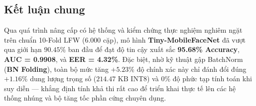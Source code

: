 \documentclass[11pt,a4paper]{article}
\begin{document}
\subsection{Kết luận chung}
Qua quá trình nâng cấp có hệ thống và kiểm chứng thực nghiệm nghiêm ngặt trên chuẩn 10-Fold LFW (6.000 cặp), mô hình \textbf{Tiny-MobileFaceNet} đã vượt qua giới hạn $90.45\%$ ban đầu để đạt độ tin cậy xuất sắc \textbf{95.68\% Accuracy}, \textbf{AUC = 0.9908}, và \textbf{EER = 4.32\%}. Đặc biệt, nhờ kỹ thuật gập BatchNorm (\textbf{BN Folding}), toàn bộ mức tăng $+5.23\%$ độ chính xác này chỉ đánh đổi đúng $+1.16\%$ dung lượng trọng số ($214.47\text{ KB}$ INT8) và $0\%$ độ phức tạp tính toán khi suy diễn — khẳng định tính khả thi rất cao để triển khai thực tế lên các hệ thống nhúng và bộ tăng tốc phần cứng chuyên dụng.
\end{document}
